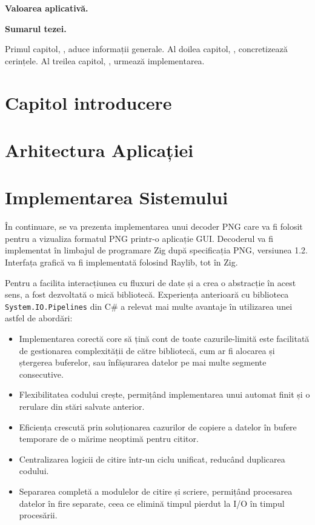 \documentclass[a4paper,12pt]{report}
\begin{document}
\textbf{Valoarea aplicativă.}

\textbf{Sumarul tezei.}

Primul capitol, , aduce informații generale.
Al doilea capitol, , concretizează cerințele.
Al treilea capitol, , urmează implementarea.


\chapter{Capitol introducere}\label{intro_chapter_title}



\chapter{Arhitectura Aplicației}\label{architecture_chapter_title}



\chapter{Implementarea Sistemului}\label{implementation_chapter_title}

În continuare, se va prezenta implementarea unui decoder \ac{PNG} care va fi folosit pentru
a vizualiza formatul \ac{PNG} printr-o aplicație \ac{GUI}.
Decoderul va fi implementat în limbajul de programare Zig\cite{zig}
după specificația \ac{PNG}, versiunea 1.2\cite{png_spec}.
Interfața grafică va fi implementată folosind Raylib\cite{raylib}, tot în Zig.

Pentru a facilita interacțiunea cu fluxuri de date și a crea o abstracție în acest sens,
a fost dezvoltată o mică bibliotecă.
Experiența anterioară cu biblioteca \texttt{System.IO.Pipelines}\cite{system_io_pipelines}
din C\# a relevat mai multe avantaje în utilizarea unei astfel de abordări:
\begin{itemize}
  \item
  Implementarea corectă core să țină cont de toate cazurile-limită
  este facilitată de gestionarea complexității de către
  bibliotecă, cum ar fi alocarea și ștergerea buferelor,
  sau înfășurarea datelor pe mai multe segmente consecutive.

  \item
  Flexibilitatea codului crește, permițând implementarea unui automat finit
  și o rerulare din stări salvate anterior.

  \item
  Eficiența crescută prin soluționarea cazurilor de copiere a datelor în bufere temporare
  de o mărime neoptimă pentru cititor.

  \item
  Centralizarea logicii de citire într-un ciclu unificat,
  reducând duplicarea codului.

  \item
  Separarea completă a modulelor de citire și scriere,
  permițând procesarea datelor în fire separate,
  ceea ce elimină timpul pierdut la \ac{I/O} în timpul procesării.
\end{itemize}
\end{document}
